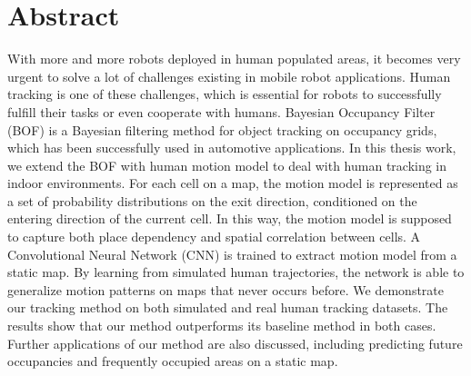 \chapter*{Abstract}
\label{sec:abstract}

With more and more robots deployed in human populated areas, it becomes very urgent to solve a lot of challenges existing in mobile robot applications. Human tracking is one of these challenges, which is essential for robots to successfully fulfill their tasks or even cooperate with humans. Bayesian Occupancy Filter (BOF) is a Bayesian filtering method for object tracking on occupancy grids, which has been successfully used in automotive applications. In this thesis work, we extend the BOF with human motion model to deal with human tracking in indoor environments. For each cell on a map, the motion model is represented as a set of probability distributions on the exit direction, conditioned on the entering direction of the current cell. In this way, the motion model is supposed to capture both place dependency and spatial correlation between cells. A Convolutional Neural Network (CNN) is trained to extract motion model from a static map. By learning from simulated human trajectories, the network is able to generalize motion patterns on maps that never occurs before. We demonstrate our tracking method on both simulated and real human tracking datasets. The results show that our method outperforms its baseline method in both cases. Further applications of our method are also discussed, including predicting future occupancies and frequently occupied areas on a static map.

